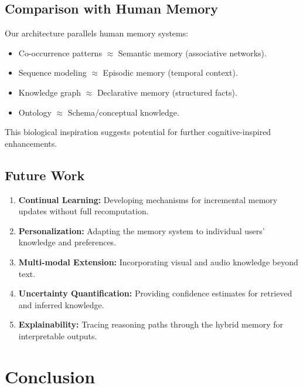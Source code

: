 \documentclass[conference]{IEEEtran}
\begin{document}
\subsection{Comparison with Human Memory}

Our architecture parallels human memory systems:

\begin{itemize}
    \item Co-occurrence patterns $\approx$ Semantic memory (associative networks).
    \item Sequence modeling $\approx$ Episodic memory (temporal context).
    \item Knowledge graph $\approx$ Declarative memory (structured facts).
    \item Ontology $\approx$ Schema/conceptual knowledge.
\end{itemize}

This biological inspiration suggests potential for further cognitive-inspired enhancements.

\subsection{Future Work}

\begin{enumerate}
    \item \textbf{Continual Learning:} Developing mechanisms for incremental memory updates without full recomputation.
    
    \item \textbf{Personalization:} Adapting the memory system to individual users' knowledge and preferences.
    
    \item \textbf{Multi-modal Extension:} Incorporating visual and audio knowledge beyond text.
    
    \item \textbf{Uncertainty Quantification:} Providing confidence estimates for retrieved and inferred knowledge.
    
    \item \textbf{Explainability:} Tracing reasoning paths through the hybrid memory for interpretable outputs.
\end{enumerate}

\section{Conclusion}
\end{document}
